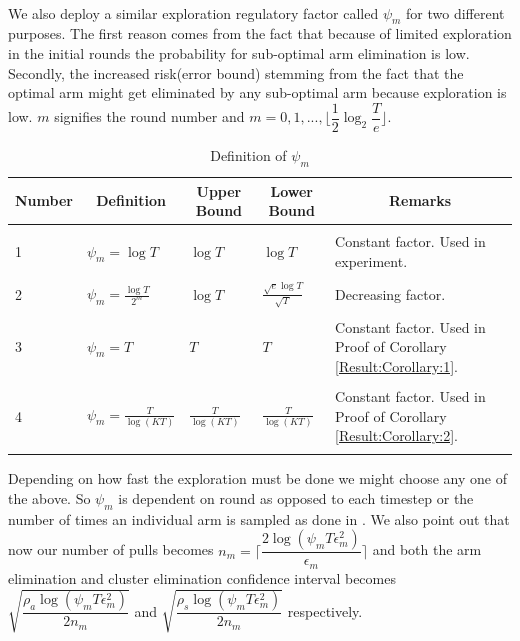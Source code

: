 \paragraph*{} We also deploy a similar exploration regulatory factor called $\psi_{m}$ for two different purposes. The first reason comes from the fact that because of limited exploration in the initial rounds the probability for sub-optimal arm elimination is low. Secondly, the increased risk(error bound) stemming from the fact that the optimal arm might get eliminated by any sub-optimal arm because exploration is low. $m$ signifies the round number and $m=0,1,...,\big \lfloor \dfrac{1}{2}\log_{2} \dfrac{T}{e}\big\rfloor$.
	
\begin{table}
\caption{Definition of $\psi_{m}$}
\label{App:D:table:1}
\begin{center}
\begin{tabular}{p{1cm}p{4cm}p{2cm}p{2cm}p{5cm}}
\multicolumn{1}{c}{\bf Number} &\multicolumn{1}{c}{\bf Definition}  &\multicolumn{1}{c}{\bf Upper Bound} &\multicolumn{1}{c}{\bf Lower Bound} &\multicolumn{1}{c}{\bf Remarks} \\
\hline \\
1	&$\psi_{m}=\log{T}$         & $\log{T}$  &$\log{T}$ & Constant factor. Used in experiment. \\ 
\hline \\
2	&$\psi_{m}=\frac{\log T}{2^{m}}$         & $\log T$  &$\frac{\sqrt{e}\log T}{\sqrt{T}}$ & Decreasing factor.  \\  
\hline \\
3	&$\psi_{m}=T$         & $T$  &$ T$ & Constant factor. Used in Proof of Corollary \ref{Result:Corollary:1}. \\ 
\hline \\ 
4	&$\psi_{m}=\frac{T}{\log (KT)}$         & $\frac{T}{\log (KT)}$  &$\frac{T}{\log (KT)}$ & Constant factor. Used in Proof of Corollary \ref{Result:Corollary:2}. \\ 
\hline \\
\end{tabular}
\end{center}	
\end{table}
	Depending on how fast the exploration must be done we might choose any one of the above. So $\psi_{m}$ is dependent on round as opposed to each timestep or the number of times an individual arm is sampled as done in \cite{liu2016modification}. We also point out that now our number of pulls becomes $n_{m}=\bigg\lceil\dfrac{2\log{(\psi_{m}T\epsilon_{m}^{2})}}{\epsilon_{m}}\bigg\rceil$ and both the arm elimination and cluster elimination confidence interval becomes $\sqrt{\dfrac{\rho_{a}\log{(\psi_{m}T\epsilon_{m}^{2})}}{2 n_{m}}}$ and $\sqrt{\dfrac{\rho_{s} \log{(\psi_{m}T\epsilon_{m}^{2})}}{2 n_{m}}}$  respectively.
	
